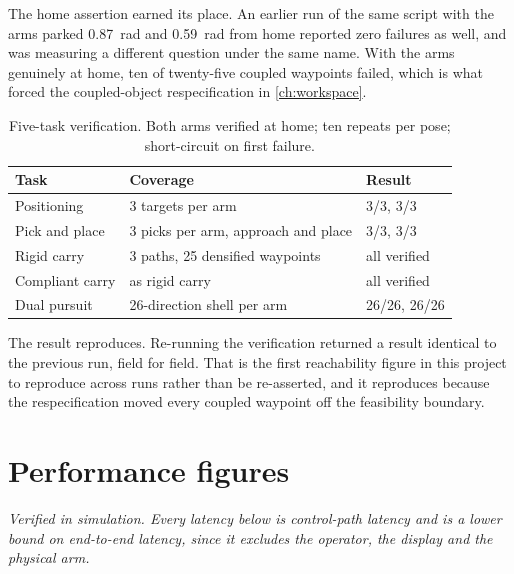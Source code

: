 The home assertion earned its place. An earlier run of the same script with
the arms parked \SI{0.87}{\radian} and \SI{0.59}{\radian} from home reported
zero failures as well, and was measuring a different question under the same
name. With the arms genuinely at home, ten of twenty-five coupled waypoints
failed, which is what forced the coupled-object respecification in
\cref{ch:workspace}.

\begin{table}[htbp]
  \centering
  \caption{Five-task verification. Both arms verified at home; ten repeats per
  pose; short-circuit on first failure.}
  \label{tab:final5}
  \begin{tabular}{@{}lll@{}}
    \toprule
    Task & Coverage & Result \\
    \midrule
    Positioning       & 3 targets per arm                    & 3/3, 3/3 \\
    Pick and place    & 3 picks per arm, approach and place  & 3/3, 3/3 \\
    Rigid carry       & 3 paths, 25 densified waypoints      & all verified \\
    Compliant carry   & as rigid carry                       & all verified \\
    Dual pursuit      & 26-direction shell per arm           & 26/26, 26/26 \\
    \bottomrule
  \end{tabular}
\end{table}

The result reproduces. Re-running the verification returned a result identical
to the previous run, field for field. That is the first reachability figure in
this project to reproduce across runs rather than be re-asserted, and it
reproduces because the respecification moved every coupled waypoint off the
feasibility boundary.

\section{Performance figures}

\emph{Verified in simulation. Every latency below is control-path latency and
is a lower bound on end-to-end latency, since it excludes the operator, the
display and the physical arm.}

